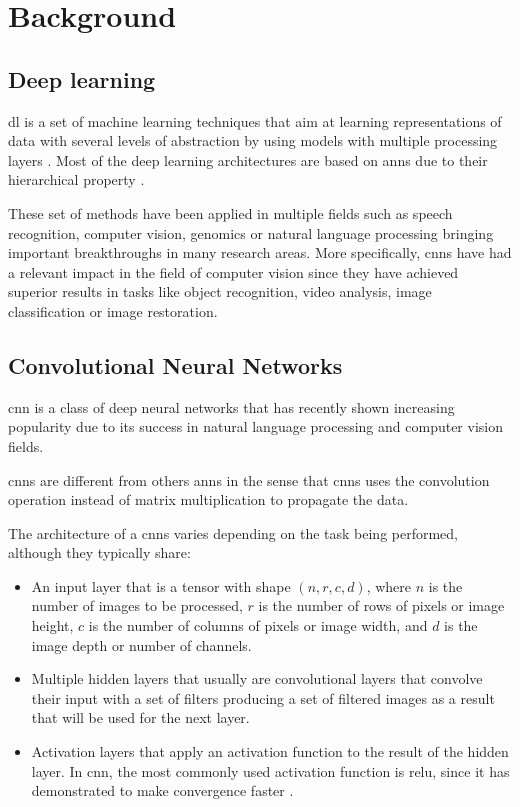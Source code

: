 \section{Background}\label{sec:background}

\subsection{Deep learning}
\gls{dl} is a set of machine learning techniques that aim at learning representations of data with several levels of abstraction by using models with multiple processing layers \cite{DL2}. Most of the deep learning architectures are based on \glspl{ann} due to their hierarchical property \cite{DL1} \cite{DBLP:DEEPSISR}.

These set of methods have been applied in multiple fields such as speech recognition, computer vision, genomics or natural language processing bringing important breakthroughs in many research areas. More specifically, \glspl{cnn} have had a relevant impact in the field of computer vision since they have achieved superior results in tasks like object recognition, video analysis, image classification or image restoration.

\subsection{Convolutional Neural Networks}
\gls{cnn} is a class of deep neural networks that has recently shown increasing popularity due to its success in natural language processing and computer vision fields.

\glspl{cnn} are different from others \glspl{ann} in the sense that \glspl{cnn} uses the convolution operation instead of matrix multiplication to propagate the data.

The architecture of a \glspl{cnn} varies depending on the task being performed, although they typically share:
\begin{itemize}
	\item An input layer that is a tensor with shape 
	$(n, r, c, d)$, where $n$ is the number of images to be processed, $r$ is the number of rows of pixels or image height, $c$ is the number of columns of pixels or image width, and $d$ is the image depth or number of channels.
	\item Multiple hidden layers that usually are convolutional layers that convolve their input with a set of filters producing a set of filtered images as a result that will be used for the next layer.
	\item Activation layers that apply an activation function to the result of the hidden layer. In \gls{cnn}, the most commonly used activation function is \gls{relu}, since it has demonstrated to make convergence faster \cite{RELU}.
\end{itemize}


